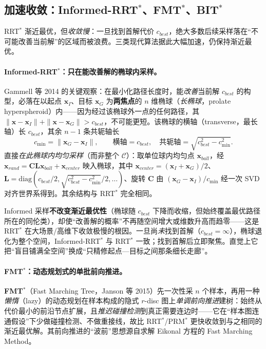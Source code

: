 \subsection{加速收敛：Informed-RRT\texorpdfstring{$^*$}{^*}、FMT\texorpdfstring{$^*$}{^*}、BIT\texorpdfstring{$^*$}{^*}}
\label{sec:plan-informed}

RRT$^*$ 渐近最优，但\emph{收敛慢}：一旦找到首解代价 $c_{best}$，绝大多数后续采样落在“不可能改善当前解”的区域而被浪费。三类现代算法据此大幅加速，仍保持渐近最优。

\paragraph{Informed-RRT$^*$：只在能改善解的椭球内采样。}
Gammell 等 2014\cite{gammell2014informed} 的关键观察：在最小化路径长度时，能\emph{改善}当前解 $c_{best}$ 的构型，必落在以起点 $\mathbf{x}_I$、目标 $\mathbf{x}_G$ 为\textbf{两焦点}的 $n$ 维椭球（\emph{长椭球}，prolate hyperspheroid）内——因为经过该椭球外一点的任何路径，其 $\|\mathbf{x}-\mathbf{x}_I\|+\|\mathbf{x}-\mathbf{x}_G\|>c_{best}$，不可能更短。该椭球的横轴（transverse，最长轴）长 $c_{best}$，其余 $n-1$ 条共轭轴长
\begin{equation}
  c_{\min}=\|\mathbf{x}_G-\mathbf{x}_I\|,\qquad
  \text{横轴}=c_{best},\quad\text{共轭轴}=\sqrt{c_{best}^2-c_{\min}^2}.
  \label{eq:plan-informed-axes}
\end{equation}
直接\emph{在此椭球内均匀采样}（而非整个 $\mathcal{C}$）：取单位球内均匀点 $\mathbf{x}_{ball}$，经 $\mathbf{x}_{rand}=\mathbf{C}\mathbf{L}\mathbf{x}_{ball}+\mathbf{x}_{center}$ 映入椭球，其中 $\mathbf{x}_{center}=(\mathbf{x}_I+\mathbf{x}_G)/2$、$\mathbf{L}=\mathrm{diag}(c_{best}/2,\sqrt{c_{best}^2-c_{\min}^2}/2,\dots)$、旋转 $\mathbf{C}$ 由 $(\mathbf{x}_G-\mathbf{x}_I)/c_{\min}$ 经一次 SVD 对齐世界系得到。其余结构与 RRT$^*$ 完全相同。

\begin{insight}
Informed 采样\textbf{不改变渐近最优性}（椭球随 $c_{best}$ 下降而收缩，但始终覆盖最优路径所在的同伦类），却使“改善解的概率”不再随空间增大或维数升高而趋零——这是 RRT$^*$ 在大场景/高维下收敛极慢的根因。一旦尚\emph{未}找到首解（$c_{best}=\infty$），椭球退化为整个空间，Informed-RRT$^*$ 与 RRT$^*$ 一致；找到首解后立即聚焦。直觉上它把“盲目铺满全空间”换成“只精修起点—目标之间那条细长走廊”。
\end{insight}

\paragraph{FMT$^*$：动态规划式的单批前向推进。}
\textbf{FMT$^*$}（Fast Marching Tree，Janson 等 2015\cite{janson2015fmt}）先一次性采 $n$ 个样本，再用一种\emph{懒惰}（lazy）的动态规划在样本构成的隐式 $r$-disc 图上\emph{单调前向推进}建树：始终从代价最小的前沿节点扩展，且\emph{推迟碰撞检测}到真正需要连边时——它在“样本图连通假设”下少做碰撞检测、不做重接线，故比 RRT$^*$/PRM$^*$ 更快收敛到与之相同的渐近最优解。其前向推进的“波前”思想源自求解 Eikonal 方程的 Fast Marching Method。

